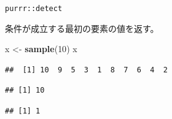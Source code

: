 \documentclass[ignorenonframetext,]{beamer}
\newenvironment{Shaded}{\begin{snugshade}}{\end{snugshade}}
\newcommand{\KeywordTok}[1]{\textcolor[rgb]{0.13,0.29,0.53}{\textbf{#1}}}
\newcommand{\DecValTok}[1]{\textcolor[rgb]{0.00,0.00,0.81}{#1}}
\newcommand{\StringTok}[1]{\textcolor[rgb]{0.31,0.60,0.02}{#1}}
\newcommand{\OperatorTok}[1]{\textcolor[rgb]{0.81,0.36,0.00}{\textbf{#1}}}
\newcommand{\NormalTok}[1]{#1}
\begin{document}
\begin{frame}[fragile]{\texttt{purrr::detect}}

条件が成立する最初の要素の値を返す。

\begin{Shaded}
\begin{Highlighting}[]
\NormalTok{x <-}\StringTok{ }\KeywordTok{sample}\NormalTok{(}\DecValTok{10}\NormalTok{)}
\NormalTok{x}
\end{Highlighting}
\end{Shaded}

\begin{verbatim}
##  [1] 10  9  5  3  1  8  7  6  4  2
\end{verbatim}

\begin{Shaded}
\end{Shaded}

\begin{verbatim}
## [1] 10
\end{verbatim}

\begin{Shaded}
\end{Shaded}

\begin{verbatim}
## [1] 1
\end{verbatim}

\end{frame}
\end{document}
